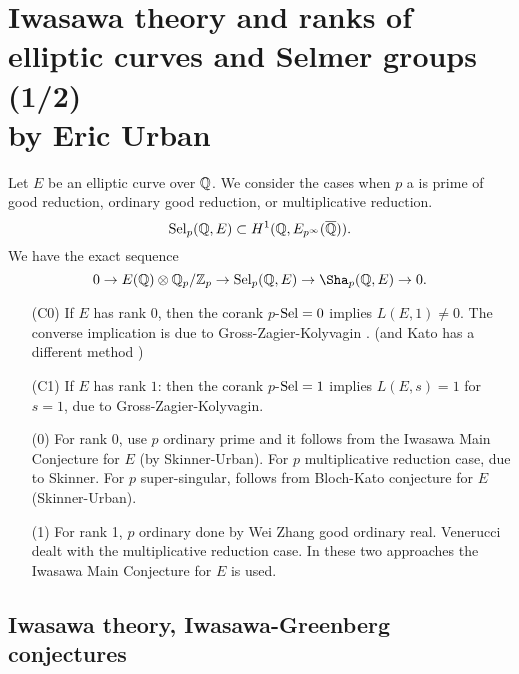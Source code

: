 \documentclass[12pt,amsfont]{amsart}
\begin{document}
\section{Iwasawa theory and ranks of elliptic curves and Selmer groups (1/2)\\ by Eric Urban}\label{2}
Let $E$ be an elliptic curve over ${\mathbb Q}$. We consider the cases when $p$ a is prime of good reduction, ordinary good reduction, or multiplicative reduction.    
\[
\operatorname{Sel}_p({\mathbb Q}, E) \subset H^1({\mathbb Q}, E_{p^\infty}(\overline{{\mathbb Q}})).
\]
We have the exact sequence
\[
0 \rightarrow E(\bQ) \otimes \bQ_p / \bZ_p \rightarrow \Sel_p(\bQ, E) \rightarrow \Sha_p(\bQ, E) \rightarrow 0.
\]
\begin{enumerate}
\item[(C0)]
If $E$ has rank $0$, then the corank $p$-$\operatorname{Sel} = 0$ implies $L(E, 1) \ne 0$. The converse implication is due to Gross-Zagier-Kolyvagin . (and Kato has a different method )
\item[(C1)]
If $E$ has rank $1$: then the corank $p$-$\operatorname{Sel} = 1$ implies $ L(E,s) = 1$ for $s = 1$, due to Gross-Zagier-Kolyvagin.
\item[(0)]
For rank $0$, use $p$ ordinary prime and it follows from the Iwasawa Main Conjecture for $E$ (by Skinner-Urban). For $p$ multiplicative reduction case, due to Skinner. For $p$ super-singular, follows from Bloch-Kato conjecture for $E$ (Skinner-Urban). 
\item[(1)]
For rank 1, $p$ ordinary done by Wei Zhang good ordinary real. Venerucci dealt with the multiplicative reduction case. In these two approaches the Iwasawa Main Conjecture for $E$ is used. 
\end{enumerate}
\subsection{Iwasawa theory, Iwasawa-Greenberg conjectures}
{\ }
\end{document}
